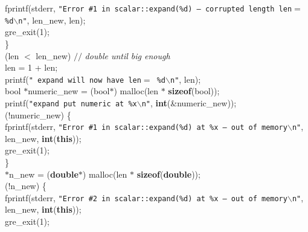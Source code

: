 \begin{flushleft}
\hspace*{8\indentation}fprintf(stderr, {\tt"Error \#1 in scalar::expand(\%d) -- corrupted length len$=$ \%d$\backslash$n"}, len\_new, len);\mbox{}\\
\hspace*{8\indentation}gre\_exit(1);\mbox{}\\
\hspace*{4\indentation}\}\mbox{}\\
\hspace*{4\indentation}{\bf while} (len $<$ len\_new)       {$//$\it{} double until big enough{}\mbox{}\\
}\hspace*{8\indentation}len = 1 + len;\mbox{}\\
\hspace*{4\indentation}printf({\tt"   expand will now have len$=$ \%d$\backslash$n"}, len);\mbox{}\\
\hspace*{4\indentation}bool $\ast$numeric\_new = (bool$\ast$) malloc(len $\ast$ {\bf sizeof}(bool));\mbox{}\\
\hspace*{4\indentation}printf({\tt"expand put numeric at \%x$\backslash$n"}, {\bf int}(\&numeric\_new));\mbox{}\\
\hspace*{4\indentation}{\bf if} (!numeric\_new) \{\mbox{}\\
\hspace*{8\indentation}fprintf(stderr, {\tt"Error \#1 in scalar::expand(\%d) at \%x -- out of memory$\backslash$n"}, len\_new, {\bf int}({\bf this}));\mbox{}\\
\hspace*{8\indentation}gre\_exit(1);\mbox{}\\
\hspace*{4\indentation}\}\mbox{}\\
\hspace*{4\indentation}{\bf double} $\ast$n\_new = ({\bf double}$\ast$) malloc(len $\ast$ {\bf sizeof}({\bf double}));\mbox{}\\
\hspace*{4\indentation}{\bf if} (!n\_new) \{\mbox{}\\
\hspace*{8\indentation}fprintf(stderr, {\tt"Error \#2 in scalar::expand(\%d) at \%x -- out of memory$\backslash$n"}, len\_new, {\bf int}({\bf this}));\mbox{}\\
\hspace*{8\indentation}gre\_exit(1);\mbox{}\\

\end{flushleft}
